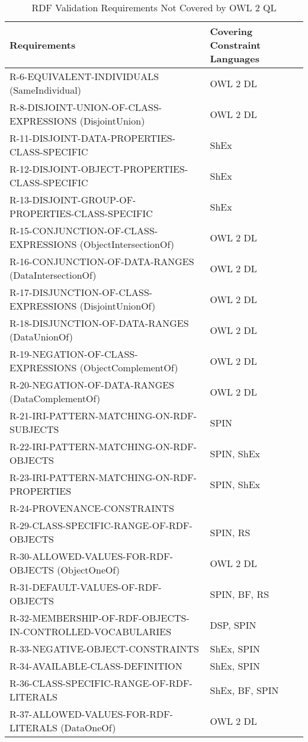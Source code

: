 \documentclass{llncs}
\newcommand{\hr}{\hline\noalign{\smallskip}} %
\begin{document}
\begin{table}
\caption{RDF Validation Requirements Not Covered by OWL 2 QL}
\label{tab:RequirementsNotCoveredOWL2QL-1}
\centering
\begin{tabular}{ll}
\hr
Requirements & Covering Constraint Languages \\
\hr
R-6-EQUIVALENT-INDIVIDUALS (SameIndividual) & OWL 2 DL \\
R-8-DISJOINT-UNION-OF-CLASS-EXPRESSIONS (DisjointUnion) & OWL 2 DL \\
R-11-DISJOINT-DATA-PROPERTIES-CLASS-SPECIFIC & ShEx \\
R-12-DISJOINT-OBJECT-PROPERTIES-CLASS-SPECIFIC & ShEx \\
R-13-DISJOINT-GROUP-OF-PROPERTIES-CLASS-SPECIFIC & ShEx \\
R-15-CONJUNCTION-OF-CLASS-EXPRESSIONS (ObjectIntersectionOf) & OWL 2 DL \\
R-16-CONJUNCTION-OF-DATA-RANGES (DataIntersectionOf) & OWL 2 DL \\
R-17-DISJUNCTION-OF-CLASS-EXPRESSIONS (DisjointUnionOf) & OWL 2 DL \\
R-18-DISJUNCTION-OF-DATA-RANGES (DataUnionOf) & OWL 2 DL \\
R-19-NEGATION-OF-CLASS-EXPRESSIONS (ObjectComplementOf) & OWL 2 DL \\
R-20-NEGATION-OF-DATA-RANGES (DataComplementOf) & OWL 2 DL \\
R-21-IRI-PATTERN-MATCHING-ON-RDF-SUBJECTS & SPIN \\
R-22-IRI-PATTERN-MATCHING-ON-RDF-OBJECTS & SPIN, ShEx \\
R-23-IRI-PATTERN-MATCHING-ON-RDF-PROPERTIES & SPIN, ShEx \\
R-24-PROVENANCE-CONSTRAINTS & \\
R-29-CLASS-SPECIFIC-RANGE-OF-RDF-OBJECTS & SPIN, RS \\
R-30-ALLOWED-VALUES-FOR-RDF-OBJECTS (ObjectOneOf) & OWL 2 DL \\
R-31-DEFAULT-VALUES-OF-RDF-OBJECTS & SPIN, BF, RS \\
R-32-MEMBERSHIP-OF-RDF-OBJECTS-IN-CONTROLLED-VOCABULARIES & DSP, SPIN \\
R-33-NEGATIVE-OBJECT-CONSTRAINTS & ShEx, SPIN \\
R-34-AVAILABLE-CLASS-DEFINITION & ShEx, SPIN \\
R-36-CLASS-SPECIFIC-RANGE-OF-RDF-LITERALS & ShEx, BF, SPIN \\
R-37-ALLOWED-VALUES-FOR-RDF-LITERALS (DataOneOf) & OWL 2 DL \\

\end{tabular}
\end{table}
\end{document}
